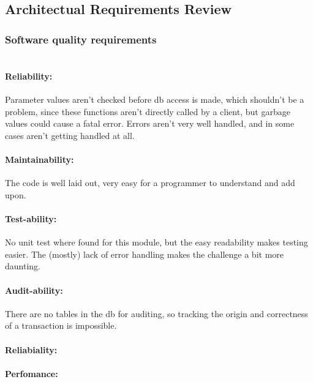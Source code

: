 \subsection{Architectual Requirements Review}

\subsubsection{Software quality requirements} 

\paragraph{\\Reliability:}
Parameter values aren't checked before db access is made, which shouldn't be a problem, since these functions aren't directly called by a client, but garbage values could cause a fatal error. Errors aren't very well handled, and in some cases aren't getting handled at all.
\par
\paragraph{Maintainability:}
The code is well laid out, very easy for a programmer to understand and add upon.
\par
\paragraph{Test-ability:}
 No unit test where found for this module, but the easy readability makes testing easier. The (mostly) lack of error handling makes the challenge a bit more daunting.
\par
\paragraph {Audit-ability:}
There are no tables in the db for auditing, so tracking the origin and correctness of a transaction is impossible.
\\
\par
\paragraph{Reliabiality:}
\par
\paragraph{Perfomance:}
\par
